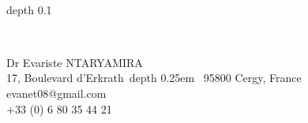 \documentclass[12pt]{article}
\begin{document}
\begin{minipage}[c]{8in}\vskip-2cm
\begin{flushleft}
	\,\,
	\begin{minipage}[c]{0.25cm}
		\vrule depth 0.1\textheight
	\end{minipage}
	\,
	\begin{minipage}[c]{8cm}
		\footnotesize
		{\sffamily
			Dr Evariste NTARYAMIRA\\
			17, Boulevard d'Erkrath \,\vrule depth 0.25em \, 95800 Cergy, France \\
			evanet08@gmail.com\\
			+33 (0) 6 80 35 44 21
		}
	\end{minipage}
\end{flushleft}
\end{minipage}
\end{document}
